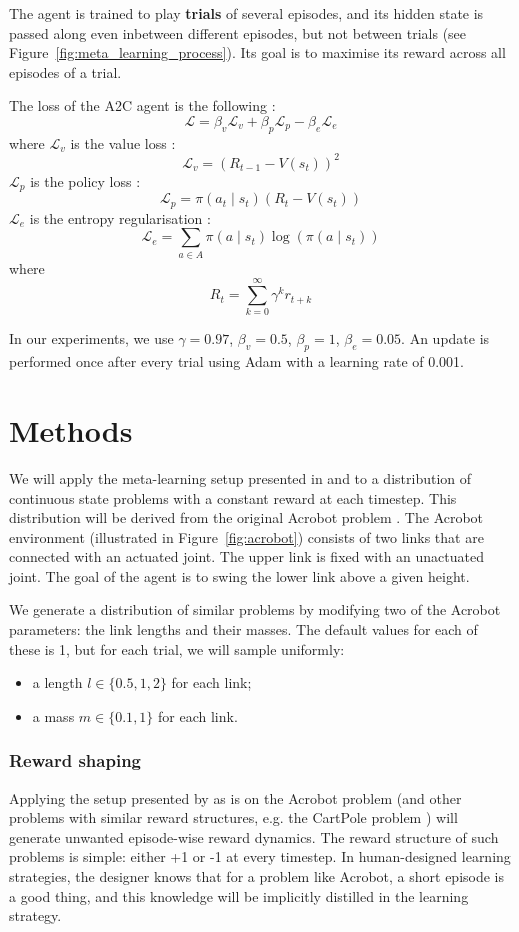 \documentclass[letterpaper]{article}
\begin{document}
The agent is trained to play \textbf{trials} of several episodes, and its
hidden state is passed along even inbetween different episodes, but not
between trials (see Figure~\ref{fig:meta_learning_process}). Its goal is to 
maximise its reward across all episodes of a trial.

The loss of the A2C agent is the following : 
$$ \mathcal{L} = \beta_v \mathcal{L}_v + \beta_p \mathcal{L}_p - \beta_e 
 \mathcal{L}_e $$
where $\mathcal{L}_v$ is the value loss : 
$$ \mathcal{L}_v = (R_{t-1} - V(s_t))^2$$
$\mathcal{L}_p$ is the policy loss : 
$$ \mathcal{L}_p = \pi(a_t \mid s_t) (R_t - V(s_t))$$
$\mathcal{L}_e$ is the entropy regularisation : 
$$ \mathcal{L}_e = \sum\limits_{a \in A}\pi(a \mid s_t)\log(\pi(a \mid s_t))$$
where 
$$R_t = \sum\limits_{k=0}^{\infty} \gamma^k r_{t+k}$$

In our experiments, we use $\gamma = 0.97$, $\beta_v = 0.5$, $\beta_p = 1$, 
$\beta_e = 0.05$. An update is performed
once after every trial using Adam \citep{adam} with a learning rate of 0.001.\\



\section{Methods}
We will apply the meta-learning setup presented in \cite{learningtorl} and
\cite{fastrlviaslowrl} to a distribution of continuous state problems with a 
constant reward at each timestep. This distribution will be derived from
the original Acrobot problem \citep{acrobot1996, acrobot2015}. The Acrobot
environment (illustrated in Figure~\ref{fig:acrobot}) consists of two links 
that are connected with an actuated joint. The upper link is fixed with an 
unactuated joint. The goal of the agent is to swing the lower link above a 
given height.

We generate a distribution of similar problems by modifying
two of the Acrobot parameters: the link lengths and their masses. The default
values for each of these is 1, but for each trial, we will sample uniformly:
\begin{itemize}
	\item a length $l \in \{0.5, 1, 2\}$ for each link;
	\item a mass $m \in \{0.1, 1\}$ for each link.
\end{itemize}

\subsubsection{Reward shaping}
Applying the setup presented by \cite{learningtorl} as is on the Acrobot
problem (and other problems with similar reward structures, e.g. the
CartPole problem \citep{barto-cartpole}) will generate unwanted episode-wise
reward dynamics. The reward structure of such problems is simple:
either +1 or -1 at every timestep. In human-designed learning strategies, the
designer knows that for a problem like Acrobot, a short episode is a good thing,
and this knowledge will be implicitly distilled in the learning strategy. 
\end{document}
